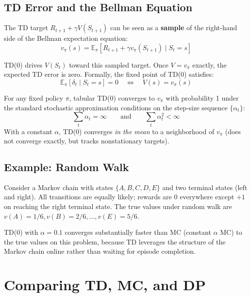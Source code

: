 \documentclass[11pt,a4paper]{article}
\theoremstyle{definition}
\theoremstyle{plain}
\theoremstyle{remark}
\begin{document}
\subsection{TD Error and the Bellman Equation}

The TD target $R_{t+1} + \gamma V(S_{t+1})$ can be seen as a \textbf{sample} of the right-hand side of the Bellman expectation equation:
\[
    v_\pi(s) = \mathbb{E}_\pi\!\left[R_{t+1} + \gamma v_\pi(S_{t+1}) \mid S_t = s\right]
\]

TD(0) drives $V(S_t)$ toward this sampled target. Once $V = v_\pi$ exactly, the expected TD error is zero. Formally, the fixed point of TD(0) satisfies:
\[
    \mathbb{E}_\pi[\delta_t \mid S_t = s] = 0 \quad \Longleftrightarrow \quad V(s) = v_\pi(s)
\]

\begin{tcolorbox}[colback=green!5!white, colframe=green!60!black, title={Convergence of TD(0)}]
For any fixed policy $\pi$, tabular TD(0) converges to $v_\pi$ with probability 1 under the standard stochastic approximation conditions on the step-size sequence $\{\alpha_t\}$:
\[
    \sum_{t} \alpha_t = \infty \qquad \text{and} \qquad \sum_{t} \alpha_t^2 < \infty
\]
With a constant $\alpha$, TD(0) converges \emph{in the mean} to a neighborhood of $v_\pi$ (does not converge exactly, but tracks nonstationary targets).
\end{tcolorbox}

\subsection{Example: Random Walk}

Consider a Markov chain with states $\{A, B, C, D, E\}$ and two terminal states (left and right). All transitions are equally likely; rewards are $0$ everywhere except $+1$ on reaching the right terminal state. The true values under random walk are $v(A) = 1/6, v(B) = 2/6, \ldots, v(E) = 5/6$.

TD(0) with $\alpha = 0.1$ converges substantially faster than MC (constant $\alpha$ MC) to the true values on this problem, because TD leverages the structure of the Markov chain online rather than waiting for episode completion.

\section{Comparing TD, MC, and DP}
\end{document}
